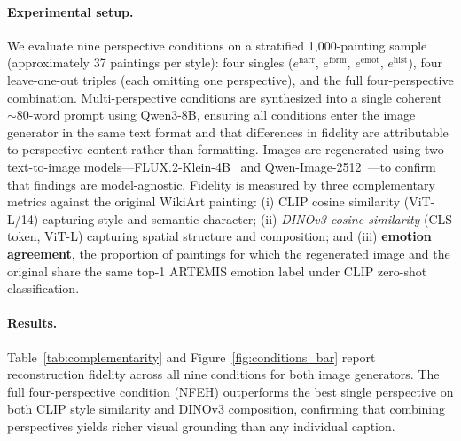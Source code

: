 \paragraph{Experimental setup.}
We evaluate nine perspective conditions on a stratified 1,000-painting sample (approximately 37 paintings per style): four singles ($e^{\text{narr}}$, $e^{\text{form}}$, $e^{\text{emot}}$, $e^{\text{hist}}$), four leave-one-out triples (each omitting one perspective), and the full four-perspective combination.
Multi-perspective conditions are synthesized into a single coherent $\sim$80-word prompt using Qwen3-8B, ensuring all conditions enter the image generator in the same text format and that differences in fidelity are attributable to perspective content rather than formatting.
Images are regenerated using two text-to-image models---FLUX.2-Klein-4B~\cite{flux2} and Qwen-Image-2512~\cite{qwenimage}---to confirm that findings are model-agnostic.
Fidelity is measured by three complementary metrics against the original WikiArt painting: (i) \textit{}{CLIP cosine similarity} (ViT-L/14) capturing style and semantic character; (ii) \textit{DINOv3 cosine similarity} (CLS token, ViT-L) capturing spatial structure and composition; and (iii) \textbf{emotion agreement}, the proportion of paintings for which the regenerated image and the original share the same top-1 ARTEMIS emotion label under CLIP zero-shot classification.

\paragraph{Results.}
Table~\ref{tab:complementarity} and Figure~\ref{fig:conditions_bar} report reconstruction fidelity across all nine conditions for both image generators.
The full four-perspective condition (NFEH) outperforms the best single perspective on both CLIP style similarity and DINOv3 composition, confirming that combining perspectives yields richer visual grounding than any individual caption.

